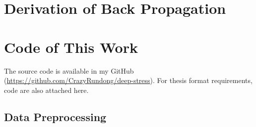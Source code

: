 
\chapter{Derivation of Back Propagation}

\chapter{Code of This Work}
The source code is available in my GitHub
(\url{https://github.com/CrazyRundong/deep-stress}).
For thesis format requirements, code are also attached here.

\section{Data Preprocessing}
